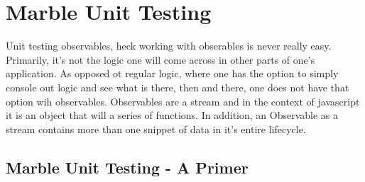 \maketitle{}
\section{ Marble Unit Testing }

Unit testing observables, heck working with obserables is never really easy.
Primarily, it's not the logic one will come across in other parts of one's
application. As opposed ot regular logic, where one has the option to simply
console out logic and see what is there, then and there, one does not have that
option wih observables. Observables are a stream and in the context of
javascript it is an object that will a series of functions. In addition, an
Observable as a stream contains more than one snippet of data in it's entire
lifecycle.

\subsection{ Marble Unit Testing - A Primer }
